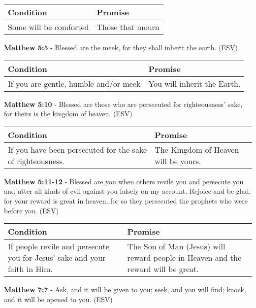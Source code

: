 \documentclass[11pt]{article}
\begin{document}
\begin{center}
\begin{tabular}{ll}
Condition & Promise\\[0pt]
\hline
Some will be comforted & Those that mourn\\[0pt]
\end{tabular}
\end{center}

\textbf{Matthew 5:5} -  Blessed are the meek, for they shall inherit the earth.  (ESV)

\begin{center}
\begin{tabular}{ll}
Condition & Promise\\[0pt]
\hline
If you are gentle, humble and/or meek & You will inherit the Earth.\\[0pt]
\end{tabular}
\end{center}

\textbf{Matthew 5:10} -  Blessed are those who are persecuted for righteousness' sake, for theirs is the kingdom of heaven.  (ESV)

\begin{center}
\begin{tabular}{ll}
Condition & Promise\\[0pt]
\hline
If you have been persecuted for the sake of righteousness. & The Kingdom of Heaven will be yours.\\[0pt]
\end{tabular}
\end{center}

\textbf{Matthew 5:11-12} -  Blessed are you when others revile you and persecute you and utter all kinds of evil against you falsely on my account.  Rejoice and be glad, for your reward is great in heaven, for so they persecuted the prophets who were before you.  (ESV)

\begin{center}
\begin{tabular}{ll}
Condition & Promise\\[0pt]
\hline
If people revile and persecute you for Jesus' sake and your faith in Him. & The Son of Man (Jesus) will reward people in Heaven and the reward will be great.\\[0pt]
\end{tabular}
\end{center}

\textbf{Matthew 7:7} -  Ask, and it will be given to you; seek, and you will find; knock, and it will be opened to you.  (ESV)
\end{document}
